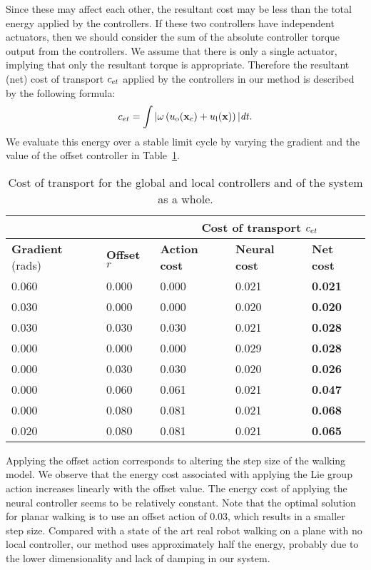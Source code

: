 Since these may affect each other, the resultant cost may be less than the total energy applied by the controllers. 
If these two controllers have independent actuators, then we should consider the sum of the absolute controller torque output from the controllers. 
We assume that there is only a single actuator, implying that only the resultant torque is appropriate.
Therefore the resultant (net) cost of transport $c_{et}$  applied by the controllers in our method  is described by the following formula:
\begin{equation}
c_{et} = \int | \omega \left(u_{\mathrm{o}}(\mathbf{x}_c) + u_{\mathrm{l}}(\mathbf{x})\right)| \mathit{dt}.
\end{equation}
We evaluate this energy over a stable limit cycle by varying the gradient and the value of the offset controller in Table~\ref{tab:energy}.
\begin{table}[htbp]
 \centering
 \begin{tabular}{|l|l|l|l|l|}\hline
  \multicolumn{2}{|c|}{}&\multicolumn{3}{|c|}{\textbf{Cost of transport} $c_{et}$}\\\hline
  \textbf{Gradient} (rads)&\textbf{Offset} $r$&\textbf{Action cost}&\textbf{Neural cost}&\textbf{Net cost}\\ \hline
  0.060&0.000&0.000&0.021&\textbf{0.021}\\
  0.030&0.000&0.000&0.020&\textbf{0.020}\\
  0.030&0.030&0.030&0.021&\textbf{0.028}\\  
  0.000&0.000&0.000&0.029&\textbf{0.028}\\
  0.000&0.030&0.030&0.020&\textbf{0.026}\\
  0.000&0.060&0.061&0.021&\textbf{0.047}\\
  0.000&0.080&0.081&0.021&\textbf{0.068}\\
  0.020&0.080&0.081&0.021&\textbf{0.065}\\\hline
 \end{tabular}
 \caption{\label{tab:energy}Cost of transport for the global and local controllers and of the system as a whole.}
\end{table}
 Applying the offset action corresponds to altering the step size of the walking model. 
 We observe that the energy cost associated with applying the Lie group action increases linearly with the offset value. 
 The energy cost of applying the neural controller seems to be relatively constant. Note that the optimal solution for planar walking is to use an offset action of 0.03, which results in a smaller step size. 
 Compared with a state of the art real robot walking on a plane \citep{collins05a} with no local controller, our method uses approximately half the energy, probably due to the lower dimensionality and lack of damping in our system.

